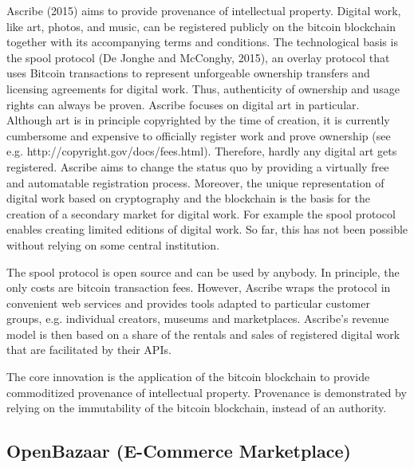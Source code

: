 Ascribe (2015) aims to provide provenance of intellectual property. Digital work, 
like art, photos, and music, can be registered publicly on the bitcoin blockchain 
together with its accompanying terms and conditions. The technological basis is 
the spool protocol (De Jonghe and McConghy, 2015), an overlay protocol that uses 
Bitcoin transactions to represent unforgeable ownership transfers and licensing 
agreements for digital work. Thus, authenticity of ownership and usage rights can 
always be proven. Ascribe focuses on digital art in particular. Although art is 
in principle copyrighted by the time of creation, it is currently cumbersome and 
expensive to officially register work and prove ownership (see e.g. http://copyright.gov/docs/fees.html). 
Therefore, hardly any digital art gets registered. Ascribe aims to change the status 
quo by providing a virtually free and automatable registration process. Moreover, 
the unique representation of digital work based on cryptography and the blockchain 
is the basis for the creation of a secondary market for digital work. For example 
the spool protocol enables creating limited editions of digital work. So far, this 
has not been possible without relying on some central institution.

The spool protocol is open source and can be used by anybody. In principle, the 
only costs are bitcoin transaction fees. However, Ascribe wraps the protocol in 
convenient web services and provides tools adapted to particular customer groups, 
e.g. individual creators, museums and marketplaces. Ascribe's revenue model is 
then based on a share of the rentals and sales of registered digital work that 
are facilitated by their APIs.

The core innovation is the application of the bitcoin blockchain to provide commoditized 
provenance of intellectual property. Provenance is demonstrated by relying on the 
immutability of the bitcoin blockchain, instead of an authority. 

\subsection{OpenBazaar (E-Commerce Marketplace)}
\label{sec:ecobazaar}

